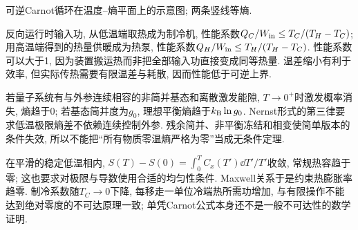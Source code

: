 \begin{center}
\par
可逆Carnot循环在温度--熵平面上的示意图; 两条竖线等熵.
\end{center}

反向运行时输入功, 从低温端取热成为制冷机, 性能系数$Q_C/W_{\rm in}\le T_C/(T_H-T_C)$; 用高温端得到的热量供暖成为热泵, 性能系数$Q_H/W_{\rm in}\le T_H/(T_H-T_C)$. 性能系数可以大于1, 因为装置搬运热而非把全部输入功直接变成同等热量. 温差缩小有利于效率, 但实际传热需要有限温差与耗散, 因而性能低于可逆上界.

若量子系统有与外参连续相容的非简并基态和离散激发能隙, $T\to0^+$时激发概率消失, 熵趋于0; 若基态简并度为$g_0$, 理想平衡熵趋于$k_{\mathrm B}\ln g_0$. Nernst形式的第三律要求低温极限熵差不依赖连续控制外参. 残余简并、非平衡冻结和相变使简单版本的条件失效, 所以不能把“所有物质零温熵严格为零”当成无条件定理.

在平滑的稳定低温相内, $S(T)-S(0)=\int_0^T C_x(T')\dd T'/T'$收敛, 常规热容趋于零; 这也要求对极限与导数使用合适的均匀性条件. Maxwell关系于是约束热膨胀率趋零. 制冷系数随$T_C\to0$下降, 每移走一单位冷端热所需功增加, 与有限操作不能达到绝对零度的不可达原理一致; 单凭Carnot公式本身还不是一般不可达性的数学证明.

